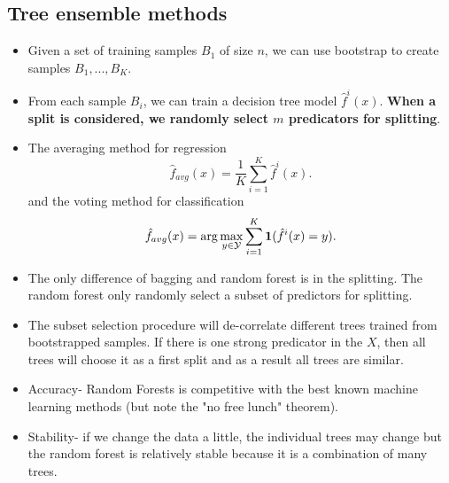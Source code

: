 \begin{refsection}
\section{Tree ensemble methods}



\begin{definition}\cite[320]{james2013introduction}\hfill
\begin{itemize}
	\item Given a set of training samples $B_1$ of size $n$, we can use bootstrap to create samples $B_1,...,B_K$. 
	\item From each sample $B_i$, we can train a decision tree model $\hat{f}^i(x)$. \textbf{When a split is considered, we randomly select $m$ predicators for splitting}.
	\item The averaging method for regression
	$$\hat{f}_{avg}(x) = \frac{1}{K}\sum_{i=1}^K \hat{f}^i(x).$$
	and the voting method for classification
	$$\hat{f}_{avg}(x) = \arg\max_{y\in \mathcal{Y}} \sum_{i=1}^K \bm{1}(\hat{f}^i(x) = y).$$
	
\end{itemize}
 
\end{definition}


\begin{remark}[interpretation]\hfill
\begin{itemize}
	\item The only difference of bagging and random forest is in the splitting. The random forest only randomly select a subset of predictors for splitting.
	\item The subset selection procedure will de-correlate different trees trained from bootstrapped samples. If there is one strong predicator in the $X$, then all trees will choose it as a first split and as a result all trees are similar. 
\end{itemize}
\end{remark}

\begin{remark}\hfill
\begin{itemize}
	\item Accuracy- Random Forests is competitive with the best known
	machine learning methods (but note the "no free lunch"
	theorem).
	\item Stability- if we change the data a little, the individual trees
	may change but the random forest is relatively stable because it is a
	combination of many trees.
\end{itemize}	
\end{remark}



\end{refsection}
